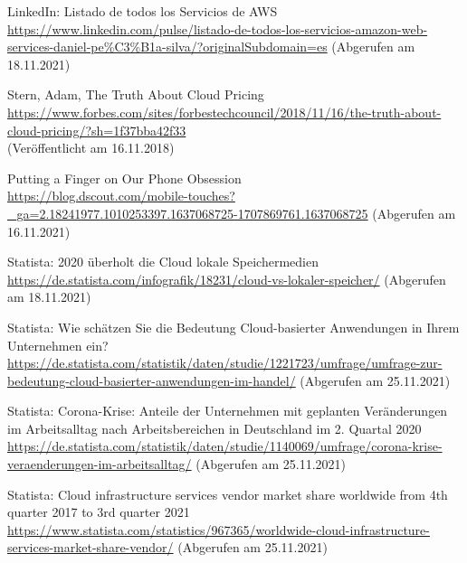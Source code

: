 \begin{thebibliography}{HR08}
  LinkedIn: Listado de todos los Servicios de AWS\\
 \url{https://www.linkedin.com/pulse/listado-de-todos-los-servicios-amazon-web-services-daniel-pe%C3%B1a-silva/?originalSubdomain=es}
 (Abgerufen am 18.11.2021)

  Stern, Adam, The Truth About Cloud Pricing \\
  \url{https://www.forbes.com/sites/forbestechcouncil/2018/11/16/the-truth-about-cloud-pricing/?sh=1f37bba42f33}\\
  (Veröffentlicht am 16.11.2018)

    Putting a Finger on Our Phone Obsession\\
 \url{https://blog.dscout.com/mobile-touches?_ga=2.18241977.1010253397.1637068725-1707869761.1637068725}
 (Abgerufen am 16.11.2021)

    Statista: 2020 überholt die Cloud lokale Speichermedien\\
 \url{https://de.statista.com/infografik/18231/cloud-vs-lokaler-speicher/}
 (Abgerufen am 18.11.2021)

    Statista: Wie schätzen Sie die Bedeutung Cloud-basierter Anwendungen in Ihrem Unternehmen ein?\\
 \url{https://de.statista.com/statistik/daten/studie/1221723/umfrage/umfrage-zur-bedeutung-cloud-basierter-anwendungen-im-handel/}
 (Abgerufen am 25.11.2021) 
  
    Statista: Corona-Krise: Anteile der Unternehmen mit geplanten Veränderungen im Arbeitsalltag nach Arbeitsbereichen in Deutschland im 2. Quartal 2020\\
 \url{https://de.statista.com/statistik/daten/studie/1140069/umfrage/corona-krise-veraenderungen-im-arbeitsalltag/}
 (Abgerufen am 25.11.2021) 
   
   Statista: Cloud infrastructure services vendor market share worldwide from 4th quarter 2017 to 3rd quarter 2021\\
 \url{https://www.statista.com/statistics/967365/worldwide-cloud-infrastructure-services-market-share-vendor/}
 (Abgerufen am 25.11.2021) 
  
\end{thebibliography}

